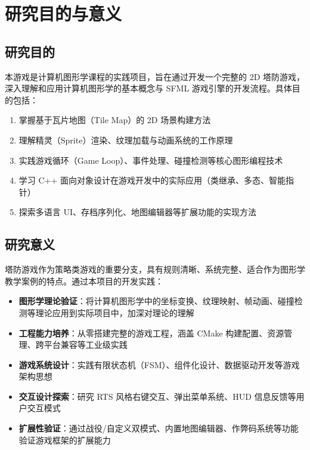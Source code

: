 \documentclass[12pt,a4paper]{ctexart}
\begin{document}
\section{研究目的与意义}

\subsection{研究目的}

本游戏是计算机图形学课程的实践项目，旨在通过开发一个完整的 2D 塔防游戏，深入理解和应用计算机图形学的基本概念与 SFML 游戏引擎的开发流程。具体目的包括：

\begin{enumerate}
    \item 掌握基于瓦片地图（Tile Map）的 2D 场景构建方法
    \item 理解精灵（Sprite）渲染、纹理加载与动画系统的工作原理
    \item 实践游戏循环（Game Loop）、事件处理、碰撞检测等核心图形编程技术
    \item 学习 C++ 面向对象设计在游戏开发中的实际应用（类继承、多态、智能指针）
    \item 探索多语言 UI、存档序列化、地图编辑器等扩展功能的实现方法
\end{enumerate}

\subsection{研究意义}

塔防游戏作为策略类游戏的重要分支，具有规则清晰、系统完整、适合作为图形学教学案例的特点。通过本项目的开发实践：

\begin{itemize}
    \item \textbf{图形学理论验证}：将计算机图形学中的坐标变换、纹理映射、帧动画、碰撞检测等理论应用到实际项目中，加深对理论的理解
    \item \textbf{工程能力培养}：从零搭建完整的游戏工程，涵盖 CMake 构建配置、资源管理、跨平台兼容等工业级实践
    \item \textbf{游戏系统设计}：实践有限状态机（FSM）、组件化设计、数据驱动开发等游戏架构思想
    \item \textbf{交互设计探索}：研究 RTS 风格右键交互、弹出菜单系统、HUD 信息反馈等用户交互模式
    \item \textbf{扩展性验证}：通过战役/自定义双模式、内置地图编辑器、作弊码系统等功能验证游戏框架的扩展能力
\end{itemize}
\end{document}
